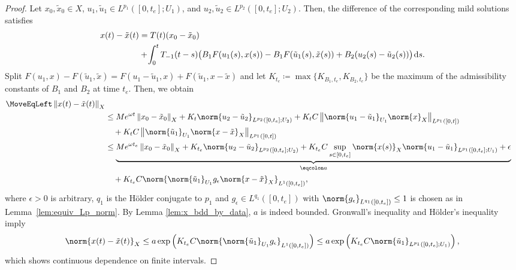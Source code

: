 \documentclass{cocv}
\newcommand{\ds}{ {\, \rm d} s}
\newcommand{\nm}[2][]{\left\lVert #2 \right\rVert_{#1}}
\theoremstyle{definition}
\begin{document}
\begin{proof}
Let $x_0, \tilde x_0 \in X$, $u_1, \tilde u_1 \in L^{p_1}([0,t_e]; U_1)$, and $u_2, \tilde u_2 \in L^{p_2}([0,t_e]; U_2)$. Then, the difference of the corresponding mild solutions satisfies
\begin{align*}
        x(t)-\tilde x(t)&= T(t)(x_0-\tilde x_0)
\\&+\! \int_{0}^t T_{-1}(t-s)\big(B_1F(u_1(s),x(s))-B_1F(\tilde u_1(s),\tilde x(s)) + B_2(u_2(s)-\tilde u_2(s)) \big)\;\!\!\ds.
\end{align*}
Split $F(u_1,x) - F(\tilde u_1,\tilde x) = F(u_1-\tilde u_1, x) + F(\tilde u_1, x - \tilde x)$ and let $K_{t_e} \coloneqq \max\{K_{B_1, t_e}, K_{B_2, t_e}\}$ be the maximum of the admissibility constants of $B_1$ and $B_2$ at time $t_e$. Then, we obtain
\begin{equation*}
    \begin{aligned}
        \MoveEqLeft \nm[X]{x(t)-\tilde x(t)} \\
        &\le Me^{\omega t}\nm[X]{x_0 - \tilde x_0} + K_t\norm{u_2-\tilde u_2}_{L^{p_2}([0,t_e];U_2)} + K_tC \nm[L^{p_1}({[0, t]})]{\norm{u_1- \tilde u_1}_{U_1} \norm{x}_X}\\
        &\hspace{1em} + K_tC \nm[L^{p_1}({[0,t]})]{ \norm{\tilde u_1}_{U_1} \norm{x-\tilde x}_X} \\
        &\le \underbrace{Me^{\omega t_e}\nm[X]{x_0 - \tilde x_0} + K_{t_e}\norm{u_2-\tilde u_2}_{L^{p_2}([0,t_e];U_2)} + K_{t_e}C \sup_{s\in [0,t_e]} \norm{x(s)}_X \norm{u_1-\tilde u_1}_{L^{p_1}([0,t_e]; U_1)} + \epsilon}_{\eqcolon a}\\
        &\hspace{1em} + K_{t_e}C \norm{\norm{\tilde u_1}_{U_1} g_\epsilon \norm{x-\tilde x}_X}_{L^1([0,t_e])},
    \end{aligned}
\end{equation*}
where $\epsilon > 0$ is arbitrary, $q_1$ is the H\"older conjugate to $p_1$ and $g_\epsilon \in L^{q_1}([0, t_e])$ with $\norm{g_\epsilon}_{L^{q_1}([0, t_e])}\le 1$ is chosen as in Lemma~\ref{lem:equiv_Lp_norm}. 
By Lemma \ref{lem:x_bdd_by_data}, $a$ is indeed bounded. Gronwall's inequality and H\"older's inequality imply
\begin{equation*}
    \norm{x(t)-\tilde x(t)}_X \le a \exp\left(K_{t_e}C \norm{\norm{\tilde u_1}_{U_1} g_\epsilon}_{L^1([0,t_e])}\right) \le a \exp\left(K_{t_e}C \norm{\tilde u_1}_{L^{p_1}([0,t_e]; U_1)}\right),
\end{equation*}
which shows continuous dependence on finite intervals.
\end{proof}
\end{document}
